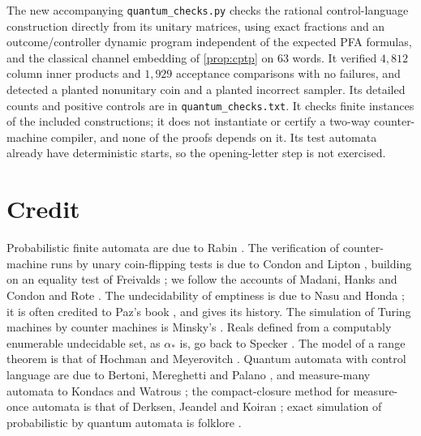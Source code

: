 \documentclass[11pt]{article}
\theoremstyle{plain}
\theoremstyle{definition}
\theoremstyle{remark}
\begin{document}
The new accompanying \texttt{quantum\_checks.py} checks the rational control-language construction directly from its unitary matrices, using exact fractions and an outcome/controller dynamic program independent of the expected PFA formulas, and the classical channel embedding of \cref{prop:cptp} on 63 words. It verified $4{,}812$ column inner products and $1{,}929$ acceptance comparisons with no failures, and detected a planted nonunitary coin and a planted incorrect sampler. Its detailed counts and positive controls are in \texttt{quantum\_checks.txt}. It checks finite instances of the included constructions; it does not instantiate or certify a two-way counter-machine compiler, and none of the proofs depends on it. Its test automata already have deterministic starts, so the opening-letter step is not exercised.
\section*{Credit}

Probabilistic finite automata are due to Rabin \cite{Rab63}. The verification of counter-machine runs by unary coin-flipping tests is due to Condon and Lipton \cite{CL89}, building on an equality test of Freivalds \cite{Fre81}; we follow the accounts of Madani, Hanks and Condon \cite{MHC99,MHC03} and Rote \cite{Rot24}. The undecidability of emptiness is due to Nasu and Honda \cite{NH69}; it is often credited to Paz's book \cite{Paz71}, and \cite{Rot24} gives its history. The simulation of Turing machines by counter machines is Minsky's \cite{Min61,Min67}. Reals defined from a computably enumerable undecidable set, as $\alpha_*$ is, go back to Specker \cite{Spe49}. The model of a range theorem is that of Hochman and Meyerovitch \cite{HM10}. Quantum automata with control language are due to Bertoni, Mereghetti and Palano \cite{BMP03,MP06}, and measure-many automata to Kondacs and Watrous \cite{KW97}; the compact-closure method for measure-once automata is that of Derksen, Jeandel and Koiran \cite{DJK05}; exact simulation of probabilistic by quantum automata is folklore \cite[Theorem~4.2]{AY15}.
\end{document}
